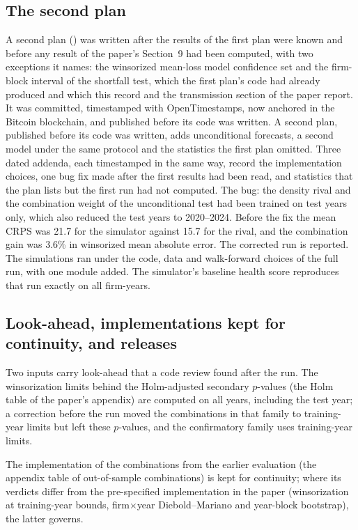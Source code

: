 \subsection{The second plan}
A second plan () was written after the results of the first plan were known and before any result of the paper's Section~9 had been computed, with two exceptions it names: the winsorized mean-loss model confidence set and the firm-block interval of the shortfall test, which the first plan's code had already produced and which this record and the transmission section of the paper report. It was committed, timestamped with OpenTimestamps, now anchored in the Bitcoin blockchain, and published before its code was written. A second plan, published before its code was written, adds unconditional forecasts, a second model under the same protocol and the statistics the first plan omitted. Three dated addenda, each timestamped in the same way, record the implementation choices, one bug fix made after the first results had been read, and statistics that the plan lists but the first run had not computed. The bug: the density rival and the combination weight of the unconditional test had been trained on test years only, which also reduced the test years to 2020--2024. Before the fix the mean CRPS was 21.7 for the simulator against 15.7 for the rival, and the combination gain was 3.6\% in winsorized mean absolute error. The corrected run is reported. The simulations ran under the code, data and walk-forward choices of the full run, with one module added. The simulator's baseline health score reproduces that run exactly on all \PRepN{} firm-years.

\subsection{Look-ahead, implementations kept for continuity, and releases}
Two inputs carry look-ahead that a code review found after the run. The winsorization limits behind the Holm-adjusted secondary $p$-values (the Holm table of the paper's appendix) are computed on all years, including the test year; a correction before the run moved the combinations in that family to training-year limits but left these $p$-values, and the confirmatory family uses training-year limits.

The implementation of the combinations from the earlier evaluation (the appendix table of out-of-sample combinations) is kept for continuity; where its verdicts differ from the pre-specified implementation in the paper (winsorization at training-year bounds, firm$\times$year Diebold--Mariano and year-block bootstrap), the latter governs.

